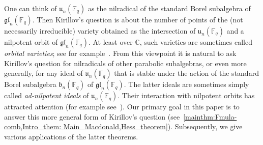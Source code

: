 \documentclass[12pt,a4paper,reqno]{amsart}
\theoremstyle{plain}
\theoremstyle{definition}
\newcommand{\FF}{{\mathbb{F}}}
\newcommand{\1}{\mathds{1}}
\renewcommand{\u}{\mathfrak{u}}
\begin{document}
One can think of  $\u_n(\FF_q)$ as the nilradical of the standard Borel subalgebra of $\mathfrak{gl}_n(\FF_q)$. Then Kirillov's question is about the number of points of the (not necessarily irreducible) variety obtained as  the intersection of $\u_n(\FF_q)$ and a nilpotent orbit of $\mathfrak{gl}_n(\FF_q)$. At least over $\mathbb C$, such varieties are sometimes called \emph{orbital varieties}; see for example~\cite{JOSEPH}.
 From this viewpoint it is natural to ask Kirillov's question for nilradicals of other parabolic subalgebras,
or even more generally, for any ideal of $\u_n(\FF_q)$ that is stable under the action of the standard Borel subalgebra 
$\mathfrak b_n(\FF_q)$ 
of $\mathfrak{gl}_n(\FF_q)$. The latter ideals are sometimes simply called \emph{ad-nilpotent ideals} of $\u_n(\FF_q)$. Their interaction with nilpotent orbits  has attracted attention (for example see~\cite{ConciniLusztigProcesi,CelliniPapi,MR4334164}). Our primary goal in this paper is to answer this more general form of Kirillov's  question (see~\cref{mainthm:Fmula-comb,Intro_them: Main_Macdonald,Hess_theorem}). Subsequently, we give various applications of the latter theorems.
\smallskip
\end{document}
